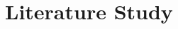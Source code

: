 \documentclass[a4paper,10pt,twoside]{report}
\begin{document}

\chapter{Literature Study}\label{chapter:preliminaries}



%


%


%


%





%
\end{document}
